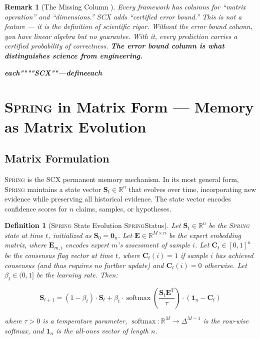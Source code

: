 \documentclass[12pt,a4paper]{article}
\newtheorem{definition}[theorem]{Definition}
\newtheorem{remark}[theorem]{Remark}
\theoremstyle{definition}
\newcommand{\Spring}{\textsc{Spring}}
\newcommand{\SCX}{\textsc{SCX}}
\DeclareMathOperator{\softmax}{softmax}
\newcommand{\R}{\mathbb{R}}
\newcommand{\ones}{\mathbf{1}}
\newcommand{\mat}[1]{\mathbf{#1}}
\newcommand{\simplex}{\Delta}
\begin{document}
\begin{remark}[The Missing Column ]
\label{rem:missing_column}
Every framework has columns for ``matrix operation'' and ``dimensions.'' \SCX{} adds
``certified error bound.'' This is not a feature — it is the definition of scientific 
rigor. Without the error bound column, you have linear algebra but no guarantee. 
With it, every prediction carries a certified probability of correctness. 
\textbf{The error bound column is what distinguishes science from engineering.}

\medskip
\noindent\textbf{each""""SCX""---defineeach}
\end{remark}

\section{\Spring{} in Matrix Form — Memory as Matrix Evolution }
\label{sec:spring_matrix}

\subsection{Matrix Formulation }

\Spring{} is the \SCX{} permanent memory mechanism. In its most general form, \Spring{}
maintains a state vector $\mat{S}_t \in \R^n$ that evolves over time, incorporating
new evidence while preserving all historical evidence. The state vector encodes
confidence scores for $n$ claims, samples, or hypotheses.

\begin{definition}[\Spring{} State Evolution \Spring{}Status]
\label{def:spring_state}
Let $\mat{S}_t \in \R^n$ be the \Spring{} state at time $t$, initialized as 
$\mat{S}_0 = \mathbf{0}_n$. Let $\mat{E} \in \R^{M \times n}$ be the expert embedding 
matrix, where $\mat{E}_{m,i}$ encodes expert $m$'s assessment of sample $i$. Let 
$\mat{C}_t \in [0,1]^n$ be the consensus flag vector at time $t$, where 
$\mat{C}_t(i) = 1$ if sample $i$ has achieved consensus (and thus requires no 
further update) and $\mat{C}_t(i) = 0$ otherwise. Let $\beta_t \in (0,1]$ be the 
learning rate. Then:

\begin{equation}\label{eq:spring_evolution}
    \boxed{\mat{S}_{t+1} = (1 - \beta_t) \cdot \mat{S}_t + \beta_t \cdot \softmax\!\left(\frac{\mat{S}_t \mat{E}^T}{\tau}\right) \cdot (\ones_n - \mat{C}_t)}
\end{equation}

where $\tau > 0$ is a temperature parameter, $\softmax: \R^M \to \simplex^{M-1}$ 
is the row-wise softmax, and $\ones_n$ is the all-ones vector of length $n$.
\end{definition}
\end{document}
